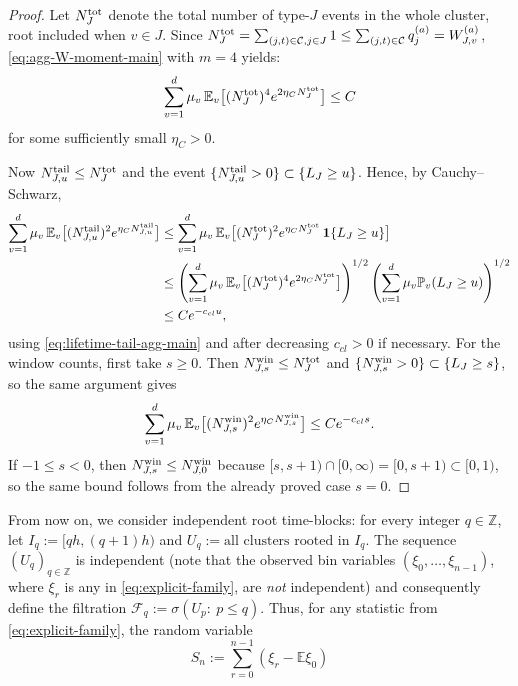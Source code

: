 \documentclass{article}
\newcommand{\Pbb}{\mathbb{P}}
\newcommand{\E}{\mathbb{E}}
\begin{document}
\begin{proof}
Let $N_J^{\rm tot}$ denote the total number of type-$J$ events in the whole cluster, root included when $v\in J$. Since $N_J^{\rm tot}=\sum_{(j,t)\in\mathcal C,j\in J}1\le\sum_{(j,t)\in\mathcal C}q_j^{(a)}= W_{J,v}^{(a)}$, \eqref{eq:agg-W-moment-main} with $m=4$ yields:
\begin{equation}
\label{eq:agg-total-count-fourth-main}
\sum_{v=1}^d \mu_v\,\E_v\big[(N_J^{\rm tot})^4 e^{2\eta_C N_J^{\rm tot}}\big]\le C
\end{equation}
for some sufficiently small $\eta_C>0$.

Now $N_{J,u}^{\rm tail}\le N_J^{\rm tot}$ and the event $\{N_{J,u}^{\rm tail}>0\}\subset \{L_J\ge u\}$. Hence, by Cauchy--Schwarz,
\begin{align*}
\sum_{v=1}^d \mu_v\,\mathbb E_v\big[(N_{J,u}^{\rm tail})^2 e^{\eta_C N_{J,u}^{\rm tail}}\big]
&\le \sum_{v=1}^d \mu_v\,\mathbb E_v\big[(N_J^{\rm tot})^2 e^{\eta_C N_J^{\rm tot}}\,\textbf{1}\{L_J\ge u\}\big]\\
&\le \left(\sum_{v=1}^d \mu_v\,\mathbb E_v\big[(N_J^{\rm tot})^4 e^{2\eta_C N_J^{\rm tot}}\big]\right)^{1/2}
\left(\sum_{v=1}^d \mu_v\Pbb_v(L_J\ge u)\right)^{1/2}\\
&\le C e^{-c_{cl} u},
\end{align*}
using \eqref{eq:lifetime-tail-agg-main} and after decreasing $c_{cl}>0$ if necessary. For the window counts, first take $s\ge 0$. Then $N_{J,s}^{\rm win}\le N_J^{\rm tot}$ and $\{N_{J,s}^{\rm win}>0\}\subset\{L_J\ge s\}$, so the same argument gives
\[
\sum_{v=1}^d \mu_v\,\E_v\big[(N_{J,s}^{\rm win})^2 e^{\eta_C N_{J,s}^{\rm win}}\big]\le C e^{-c_{cl} s}.
\]
If $-1\le s<0$, then $N_{J,s}^{\rm win}\le N_{J,0}^{\rm win}$ because $[s,s+1)\cap[0,\infty)=[0,s+1)\subset[0,1)$, so the same bound follows from the already proved case $s=0$. 
\end{proof}
From now on, we consider independent root time-blocks: for every integer $q\in\mathbb Z$, let $I_q:=[qh,(q+1)h)$ and $U_q:=\text{all clusters rooted in }I_q$. The sequence $(U_q)_{q\in\mathbb Z}$ is independent (note that the observed bin variables $(\xi_0,\dots,\xi_{n-1})$, where $\xi_r$ is any in \eqref{eq:explicit-family}, are \emph{not} independent) and consequently define the filtration $\mathcal F_q:=\sigma(U_p:\ p\le q)$. Thus, for any statistic from \eqref{eq:explicit-family}, the random variable
\begin{equation}
    \label{eq:s_nstatistic}
    S_n:=\sum_{r=0}^{n-1}(\xi_r-\mathbb E\xi_0)
\end{equation}
\end{document}
